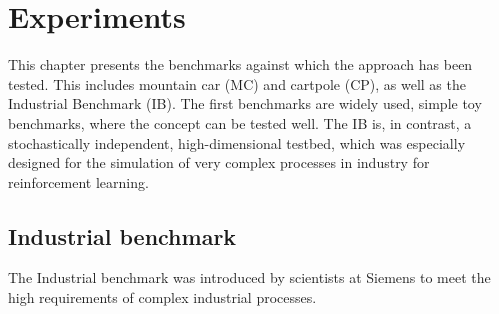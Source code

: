 \chapter{Experiments}
This chapter presents the benchmarks against which the approach has been tested. This includes mountain car (MC) and cartpole (CP), as well as the Industrial Benchmark (IB). The first benchmarks are widely used, simple toy benchmarks, where the concept can be tested well. The IB is, in contrast, a stochastically independent, high-dimensional testbed, which was especially designed for the simulation of very complex processes in industry for reinforcement learning.




 \section{Industrial benchmark}
 
The Industrial benchmark was introduced by scientists at Siemens to meet the high requirements of complex industrial processes. \cite{industrialBenchmark}
 
 
